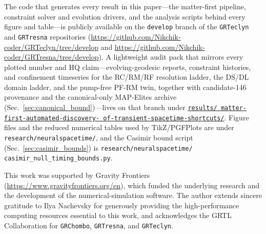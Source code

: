 \documentclass[twocolumn,floatfix,aps,prd,nofootinbib]{revtex4-2}
\begin{document}
The code that generates every result in this paper---the matter-first
pipeline, constraint solver and evolution drivers, and the analysis scripts
behind every figure and table---is publicly available on the \texttt{develop}
branch of the \texttt{GRTeclyn} and \texttt{GRTresna} repositories
(\url{https://github.com/Nikchik-coder/GRTeclyn/tree/develop} and
\url{https://github.com/Nikchik-coder/GRTresna/tree/develop}). A lightweight
audit pack that mirrors every plotted number and HQ claim---evolving-geodesic
reports, constraint histories, and confinement timeseries for the RC/RM/RF
resolution ladder, the DS/DL domain ladder, and the pump-free PF-RM twin,
together with candidate-146 provenance and the canonical-only MAP-Elites
archive (Sec.~\ref{sec:canonical_bound})---lives on that branch under
\href{https://github.com/Nikchik-coder/GRTeclyn/tree/develop/results/matter-first-automated-discovery-of-transient-spacetime-shortcuts}{\texttt{results/\allowbreak
matter-\allowbreak first-\allowbreak automated-\allowbreak discovery-\allowbreak
of-\allowbreak transient-\allowbreak spacetime-\allowbreak shortcuts/}}.
Figure files and the reduced numerical tables used by TikZ/PGFPlots are under
\texttt{research/\allowbreak neuralspacetime/}, and the Casimir bound script
(Sec.~\ref{sec:casimir_bounds}) is
\texttt{research/\allowbreak neuralspacetime/\allowbreak
casimir\_null\_timing\_bounds.py}.

\begin{acknowledgments}
This work was supported by Gravity Frontiers
(\url{https://www.gravityfrontiers.org/en}), which funded the underlying
research and the development of the numerical-simulation software. The author
extends sincere gratitude to Ilya Nachevsky for generously providing the
high-performance computing resources essential to this work, and acknowledges
the GRTL Collaboration for \texttt{GRChombo}, \texttt{GRTresna}, and
\texttt{GRTeclyn}.
\end{acknowledgments}
\end{document}
